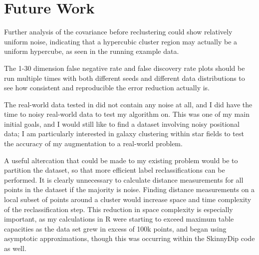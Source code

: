\documentclass{sig-alternate-05-2015}
\begin{document}
\section{Future Work}
Further analysis of the covariance before reclustering could show relatively uniform noise, indicating that a hypercubic cluster region may actually be a uniform hypercube, as seen in the running example data.

The 1-30 dimension false negative rate and false discovery rate plots should be run multiple times with both different seeds and different data distributions to see how consistent and reproducible the error reduction actually is.

The real-world data tested in \cite{skinnydip} did not contain any noise at all, and I did have the time to noisy real-world data to test my algorithm on. This was one of my main initial goals, and I would still like to find a dataset involving noisy positional data; I am particularly interested in galaxy clustering within star fields to test the accuracy of my augmentation to a real-world problem.

A useful altercation that could be made to my existing problem would be to partition the dataset, so that more efficient label reclassifications can be performed. It is clearly unnecessary to calculate distance measurements for all points in the dataset if the majority is noise. Finding distance measurements on a local subset of points around a cluster would increase space and time complexity of the reclassification step. This reduction in space complexity is especially important, as my calculations in R were starting to exceed maximum table capacities as the data set grew in excess of 100k points, and began using asymptotic approximations, though this was occurring within the SkinnyDip code as well.






\end{document}
